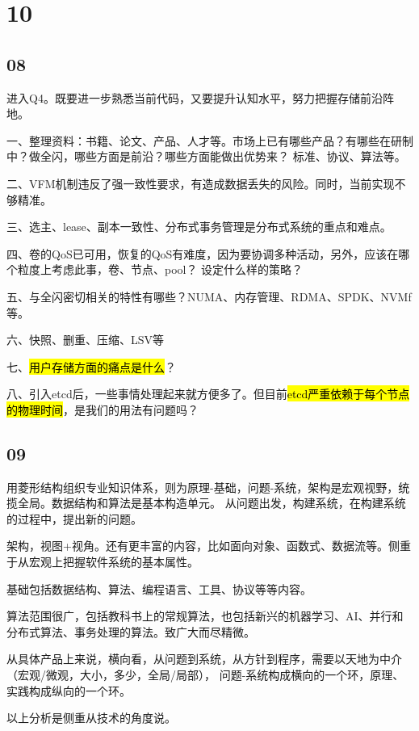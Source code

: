 \section{10}

\subsection{08}

进入Q4。既要进一步熟悉当前代码，又要提升认知水平，努力把握存储前沿阵地。

一、整理资料：书籍、论文、产品、人才等。市场上已有哪些产品？有哪些在研制中？做全闪，哪些方面是前沿？哪些方面能做出优势来？
标准、协议、算法等。

二、VFM机制违反了强一致性要求，有造成数据丢失的风险。同时，当前实现不够精准。

三、选主、lease、副本一致性、分布式事务管理是分布式系统的重点和难点。

四、卷的QoS已可用，恢复的QoS有难度，因为要协调多种活动，另外，应该在哪个粒度上考虑此事，卷、节点、pool？
设定什么样的策略？

五、与全闪密切相关的特性有哪些？NUMA、内存管理、RDMA、SPDK、NVMf等。

六、快照、删重、压缩、LSV等

七、\hl{用户存储方面的痛点是什么}？

八、引入etcd后，一些事情处理起来就方便多了。但目前\hl{etcd严重依赖于每个节点的物理时间}，是我们的用法有问题吗？

\subsection{09}

用菱形结构组织专业知识体系，则为原理-基础，问题-系统，架构是宏观视野，统揽全局。数据结构和算法是基本构造单元。
从问题出发，构建系统，在构建系统的过程中，提出新的问题。

架构，视图+视角。还有更丰富的内容，比如面向对象、函数式、数据流等。侧重于从宏观上把握软件系统的基本属性。

基础包括数据结构、算法、编程语言、工具、协议等等内容。

算法范围很广，包括教科书上的常规算法，也包括新兴的机器学习、AI、并行和分布式算法、事务处理的算法。致广大而尽精微。

从具体产品上来说，横向看，从问题到系统，从方针到程序，需要以天地为中介（宏观/微观，大小，多少，全局/局部），
问题-系统构成横向的一个环，原理、实践构成纵向的一个环。

以上分析是侧重从技术的角度说。

